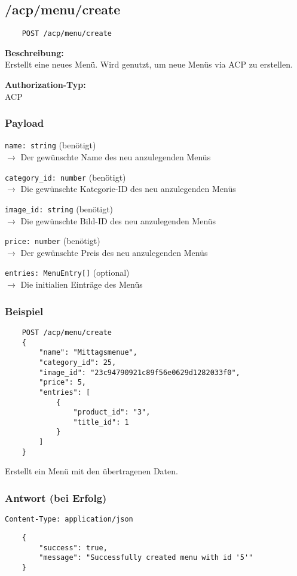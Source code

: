 \subsection{/acp/menu/create}

\begin{lstlisting}
    POST /acp/menu/create
\end{lstlisting}

\textbf{Beschreibung:} \\
Erstellt eine neues Menü. Wird genutzt, um neue Menüs via ACP zu erstellen.

\textbf{Authorization-Typ:} \\
ACP

\subsubsection{Payload}

\lstinline{name: string} (benötigt) \\
$\rightarrow$ Der gewünschte Name des neu anzulegenden Menüs

\lstinline{category_id: number} (benötigt) \\
$\rightarrow$ Die gewünschte Kategorie-ID des neu anzulegenden Menüs

\lstinline{image_id: string} (benötigt) \\
$\rightarrow$ Die gewünschte Bild-ID des neu anzulegenden Menüs

\lstinline{price: number} (benötigt) \\
$\rightarrow$ Der gewünschte Preis des neu anzulegenden Menüs

\lstinline{entries: MenuEntry[]} (optional) \\
$\rightarrow$ Die initialien Einträge des Menüs

\subsubsection{Beispiel}

\begin{lstlisting}
    POST /acp/menu/create
    {
        "name": "Mittagsmenue",
        "category_id": 25,
        "image_id": "23c94790921c89f56e0629d1282033f0",
        "price": 5,
        "entries": [
            {
                "product_id": "3",
                "title_id": 1
            }
        ]
    }
\end{lstlisting}

Erstellt ein Menü mit den übertragenen Daten.

\subsubsection{Antwort (bei Erfolg)}

\lstinline{Content-Type: application/json}
\begin{lstlisting}
    {
        "success": true, 
        "message": "Successfully created menu with id '5'"
    }
\end{lstlisting}